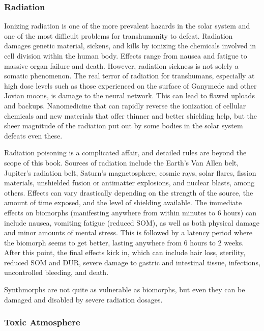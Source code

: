 \subsubsection{Radiation}

Ionizing radiation is one of the more prevalent hazards
in the solar system and one of the most difficult
problems for transhumanity to defeat. Radiation 
damages genetic material, sickens, and kills by ionizing
the chemicals involved in cell division within the
human body. Effects range from nausea and fatigue to 
massive organ failure and death. However, radiation 
sickness is not solely a somatic phenomenon. The real 
terror of radiation for transhumans, especially at high 
dose levels such as those experienced on the surface of 
Ganymede and other Jovian moons, is damage to the 
neural network. This can lead to flawed uploads and 
backups. Nanomedicine that can rapidly reverse the 
ionization of cellular chemicals and new materials that 
offer thinner and better shielding help, but the sheer 
magnitude of the radiation put out by some bodies in 
the solar system defeats even these.

Radiation poisoning is a complicated affair, and detailed
rules are beyond the scope of this book. Sources
of radiation include the Earth's Van Allen belt, Jupiter's
radiation belt, Saturn's magnetosphere, cosmic
rays, solar flares, fission materials, unshielded fusion 
or antimatter explosions, and nuclear blasts, among 
others. Effects can vary drastically depending on the 
strength of the source, the amount of time exposed, 
and the level of shielding available. The immediate 
effects on biomorphs (manifesting anywhere from 
within minutes to 6 hours) can include nausea, vomiting
fatigue (reduced SOM), as well as both physical
damage and minor amounts of mental stress. This 
is followed by a latency period where the biomorph 
seems to get better, lasting anywhere from 6 hours 
to 2 weeks. After this point, the final effects kick in, 
which can include hair loss, sterility, reduced SOM 
and DUR, severe damage to gastric and intestinal 
tissue, infections, uncontrolled bleeding, and death.

Synthmorphs are not quite as vulnerable as 
biomorphs, but even they can be damaged and disabled
by severe radiation dosages.

\subsubsection{Toxic Atmosphere}

